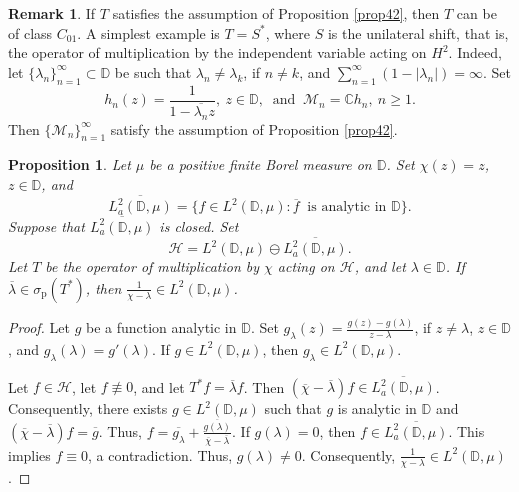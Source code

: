 \documentclass[a4paper,oneside,11pt]{amsart}
\numberwithin{equation}{section}
\theoremstyle{plain}
\newtheorem{proposition}[theorem]{Proposition}
\theoremstyle{definition}
\newtheorem{remark}[theorem]{Remark}
\begin{document}
\begin{remark} If $T$ satisfies the assumption of Proposition \ref{prop42}, then $T$ can be of class $C_{01}$. 
A simplest example is $T=S^*$, where $S$ is the unilateral shift, that is, the operator of multiplication by the independent variable acting on $H^2$. Indeed, let $\{\lambda_n\}_{n=1}^\infty\subset\mathbb D$ be such that 
$\lambda_n\neq\lambda_k$, if $n\neq k$,  and
$\sum_{n=1}^\infty(1-|\lambda_n|)=\infty$. Set 
\begin{equation*}h_n(z)=\frac{1}{1-\overline{\lambda_n}z}, \ z\in\mathbb D, \ \text{ and }
 \ \mathcal  M_n=\mathbb C h_n, \ n\geq 1. 
\end{equation*} Then  $\{\mathcal  M_n\}_{n=1}^\infty$ satisfy the  assumption of Proposition \ref{prop42}. 
\end{remark}


\begin{proposition}\label{prop45} Let $\mu$ be a positive finite Borel measure on $\mathbb D$.  
 Set  $\chi(z)=z$, $z\in\mathbb D$, and  
\begin{equation*} \overline{L^2_a(\mathbb D,\mu)}=\{f\in L^2(\mathbb D,\mu)\colon \overline f \ \text{ is analytic in } \mathbb D\}. 
\end{equation*}
Suppose that $\overline{L^2_a(\mathbb D,\mu)}$ is closed. 
Set  
\begin{equation*} \mathcal H=L^2(\mathbb D,\mu)\ominus\overline{L^2_a(\mathbb D,\mu)}.
\end{equation*}
Let $T$ be the operator of multiplication by $\chi$ acting on $\mathcal H$, and let $\lambda\in\mathbb D$. 
If $\overline\lambda\in\sigma_{\mathrm{p}}(T^*)$, then $\frac{1}{\chi-\lambda}\in L^2(\mathbb D,\mu)$.  
\end{proposition}

\begin{proof} 
Let $g$ be a function analytic in $\mathbb D$. Set $g_\lambda(z)=\frac{g(z)-g(\lambda)}{z-\lambda}$, if $z\neq\lambda$, 
$z\in\mathbb D$, and $g_\lambda(\lambda)=g'(\lambda)$. If $g\in L^2(\mathbb D,\mu)$, then $g_\lambda\in L^2(\mathbb D,\mu)$.  

Let $f\in \mathcal H$, let $f\not\equiv 0$, and let $T^*f=\overline\lambda f$. 
Then $(\overline\chi-\overline\lambda)f\in\overline{L^2_a(\mathbb D,\mu)}$. Consequently, there exists $g\in L^2(\mathbb D,\mu)$ 
such that $g$ is analytic in $\mathbb D$ and $(\overline\chi-\overline\lambda)f=\overline g$. 
Thus, $f=\overline{g_\lambda}+\frac{\overline{g(\lambda)}}{\overline\chi-\overline\lambda}$. 
 If $g(\lambda)=0$, then $f\in\overline{ L^2_a(\mathbb D,\mu)}$. 
This implies  $f\equiv 0$, a contradiction. Thus,   $g(\lambda)\neq 0$. 
Consequently,  $\frac{1}{\chi-\lambda}\in L^2(\mathbb D,\mu)$. 
\end{proof}
\end{document}
